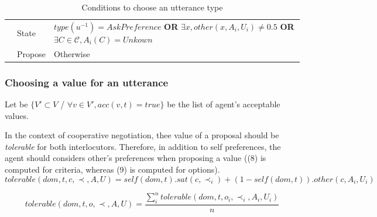 \documentclass{llncs}
\begin{document}
\begin{table} [t]
\begin{tabular}{|p{.45cm}|p{3cm}|p{8cm}|}
	\cline{2-3}
	
	& State & $type(u^{-1}) = AskPreference$
	\newline \textbf{OR}
	\newline $\exists x,other(x, A_i, U_i) \not = 0.5 $ 
	\newline \textbf{OR}
	\newline $ \exists C \in \mathcal{C}, A_i(C) = Unkown$
	\\
	\cline{2-3}
	& Propose & Otherwise \\
	\hline
	\end{tabular}
	\caption{Conditions to choose an utterance type}
	\label{utt}
	\end{table}
	
	
	\subsubsection{Choosing a value for an utterance} 
	
	Let be	$\{V' \subset V$ / $\forall v \in V', acc(v,t) = true\}$ be the list of agent's acceptable values. 
	
	In the context of cooperative negotiation, thee value of a proposal should be \textit{tolerable} for both interlocutors. Therefore, in addition to self preferences, the agent should considers other's preferences when proposing a value ((8) is computed for criteria, whereas (9) is computed for options). 	
	\begin{equation}
	tolerable(dom, t, c, \prec, A, U) = self(dom, t) . sat(c, \prec_i)  +  (1 - self(dom, t)) . other(c, A_i, U_i)
	\end{equation}
	
	\begin{equation}
	tolerable(dom, t, o, \prec, A, U) = \frac{ \sum_{i}^{n} tolerable(dom, t, o_i, \prec_i, A_i, U_i) } {n}
	\end{equation}
	
\end{document}
